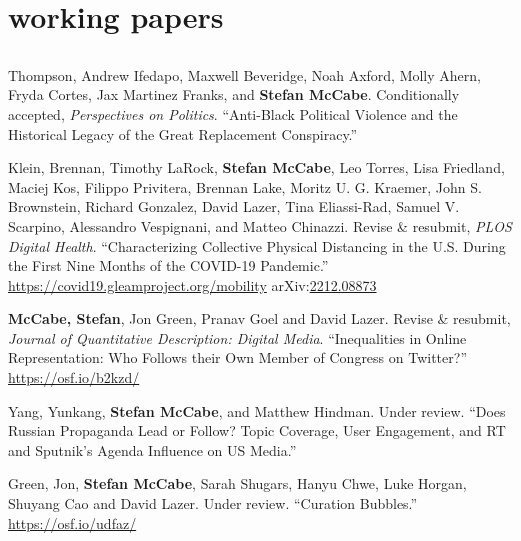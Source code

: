 \documentclass[11pt, letter]{article}
\begin{document}
\section{working papers}
\subsection*{} %
\vspace{-6mm} %
\begin{hangparas}{.25in}{1}
Thompson, Andrew Ifedapo, Maxwell Beveridge, Noah Axford, Molly Ahern, Fryda Cortes, Jax Martinez Franks, and \textbf{Stefan McCabe}. Conditionally accepted, \textit{Perspectives on Politics}. ``Anti-Black Political Violence and the Historical Legacy of the Great Replacement Conspiracy.'' \vspace{2mm}

Klein, Brennan,\textsuperscript{\textdagger} Timothy LaRock,\textsuperscript{\textdagger} \textbf{Stefan McCabe},\textsuperscript{\textdagger} Leo Torres,\textsuperscript{\textdagger} Lisa Friedland, Maciej Kos, Filippo Privitera, Brennan Lake, Moritz U. G. Kraemer, John S. Brownstein, Richard Gonzalez, David Lazer, Tina Eliassi-Rad, Samuel V. Scarpino, Alessandro Vespignani, and Matteo Chinazzi. Revise \& resubmit, \textit{PLOS Digital Health}. ``Characterizing Collective Physical Distancing in the U.S. During the First Nine Months of the COVID-19 Pandemic.'' \href{https://covid19.gleamproject.org/mobility}{https://covid19.gleamproject.org/mobility} arXiv:\href{https://arxiv.org/abs/2212.08873}{2212.08873}\vspace{2mm}

\textbf{McCabe, Stefan}, Jon Green, Pranav Goel and David Lazer. Revise \& resubmit, \textit{Journal of Quantitative Description: Digital Media}. ``Inequalities in Online Representation: Who Follows their Own Member of Congress on Twitter?'' \href{https://osf.io/b2kzd/}{https://osf.io/b2kzd/}\vspace{2mm}

Yang, Yunkang, \textbf{Stefan McCabe}, and Matthew Hindman. Under review. ``Does Russian Propaganda Lead or Follow? Topic Coverage, User Engagement, and RT and Sputnik’s Agenda Influence on US Media.'' \vspace{2mm}

Green, Jon,\textsuperscript{\textdagger} \textbf{Stefan McCabe},\textsuperscript{\textdagger} Sarah Shugars, Hanyu Chwe, Luke Horgan, Shuyang Cao and David Lazer. Under review. ``Curation Bubbles.'' \href{https://osf.io/udfaz/}{https://osf.io/udfaz/} \vspace{2mm}


\end{hangparas}
\end{document}
